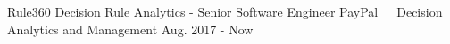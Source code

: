\documentclass[11pt, a4paper, UTF8]{awesome-cv}
\begin{document}
%
\begin{cventries}
  \cventry
    {Rule360 Decision Rule Analytics - Senior Software Engineer} %
    {PayPal{\ \cdotp\ \ }Decision Analytics and Management} %
    {Aug. 2017 - Now} %
    {\ } %
    {
      \begin{cvitems} %

\end{cvitems}}
\end{cventries}
\end{document}
